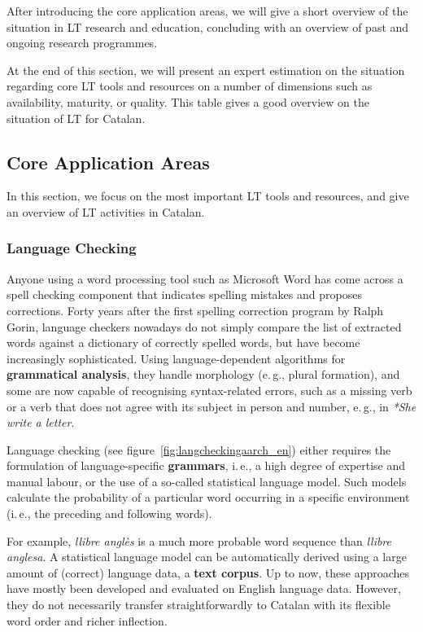 \begin{multicols}{2}
After introducing the core application areas, we will give a short overview of the situation in LT research and education, concluding with an overview of past and ongoing research programmes.

At the end of this section, we will present an expert estimation on the situation regarding core LT tools and resources on a number of dimensions such as availability, maturity, or quality. This table gives a good overview on the situation of LT for Catalan.

\subsection{Core Application Areas}

In this section, we focus on the most important LT tools and resources, and give an overview of LT activities in Catalan. 

\subsubsection{Language Checking}

Anyone using a word processing tool such as Microsoft Word has come across a spell checking component that indicates spelling mistakes and proposes corrections. Forty years after the first spelling correction program by Ralph Gorin, language checkers nowadays do not simply compare the list of extracted words against a dictionary of correctly spelled words, but have become increasingly sophisticated. Using language-dependent algorithms for \textbf{grammatical analysis}, they handle morphology (e.\,g., plural formation), and some are now capable of recognising syntax-related errors, such as a missing verb or a verb that does not agree with its subject in person and number, e.\,g., in \textit{*She write a letter}.


Language checking (see figure~\ref{fig:langcheckingaarch_en}) either requires the formulation of language-specific \textbf{grammars}, i.\,e., a high degree of expertise and manual labour, or the use of a so-called statistical language model. Such models calculate the probability of a particular word occurring in a specific environment (i.\,e., the preceding and following words).

For example, \textit{llibre anglès} is a much more probable word sequence than \textit{llibre anglesa}. A statistical language model can be automatically derived using a large amount of (correct) language data, a \textbf{text corpus}. Up to now, these approaches have mostly been developed and evaluated on English language data. However, they do not necessarily transfer straightforwardly to Catalan with its flexible word order and richer inflection. 


\end{multicols}
